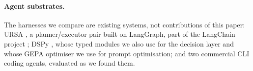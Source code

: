 \paragraph{Agent substrates.}
The harnesses we compare are existing systems, not contributions of this paper:
URSA \citep{ursa2025}, a planner/executor pair built on LangGraph, part of the
LangChain project \citep{langchain2022}; DSPy \citep{khattab2024dspy}, whose
typed modules we also use for the \Lone{} decision layer and whose GEPA
optimiser \citep{agrawal2025gepa} we use for prompt optimisation; and two
commercial CLI coding agents, evaluated as we found them.
